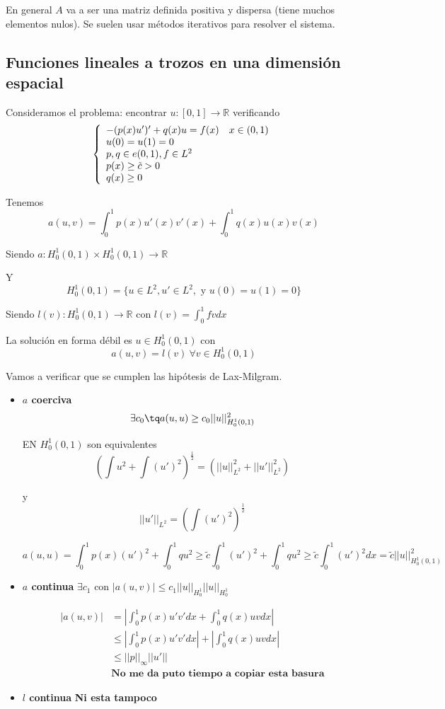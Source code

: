 	En general $A$ va a ser una matriz definida positiva y dispersa (tiene muchos elementos nulos). Se suelen usar métodos iterativos para resolver el sistema.
	
	\subsection{Funciones lineales a trozos en una dimensión espacial}
	Consideramos el problema: encontrar $u:[0,1]\longrightarrow \mathbb{R}$ verificando 
	\begin{equation}
	\left\{
		\begin{array}{l l}
		-(p(x)u')'+q(x)u=f(x) & x\in(0,1)\\
		u(0)=u(1)=0 &\\
		p,q\in e(0,1) , f\in L^2\\
		p(x) \ge \tilde{c} > 0 &\\
		q(x) \ge 0 &
		\end{array}
		\right.
	\end{equation}
	
	Tenemos
	$$a(u,v) = \int_{0}^{1}p(x) u'(x) v'(x) + \int_{0}^{1}q(x)u(x)v(x)$$
	
	Siendo $a:H_0^1(0,1)\times H_0^1(0,1) \longrightarrow \mathbb{R}$
	
	Y
	$$H_0^1(0,1) =\{u\in L^2 , u'\in L^2, \text{ y }u(0)=u(1)=0\}$$
	
	Siendo $l(v): H_0^1(0,1) \longrightarrow\mathbb{R}$ con $l(v) = \int_{0}^{1}fvdx$
	
	La solución en forma débil es $u\in H_0^1(0,1)$ con 
		$$a(u,v) = l(v) \ \forall v \in H_0^1(0,1)$$
		
	Vamos a verificar que se cumplen las hipótesis de Lax-Milgram.
	\begin{itemize}
		\item \textbf{$a$ coerciva}
		$$\exists c_0\tq a(u,u)\ge c_0||u||^2_{H_0^1(0,1)}$$
		
		EN $H_0^1(0,1)$ son equivalentes
		$$(\int u^2 + \int (u')^2)^\frac{1}{2} = (||u||^2_{L^2}+||u'||^2_{L^2})$$
		
		y
		$$||u'||_{L^2} = (\int (u')^2)^\frac{1}{2}$$
		
		$$a(u,u) = \int_0^1 p(x) (u')^2 + \int_0^1 qu^2 \ge \tilde{c} \int_0^1 (u')^2 + \int_{0}^{1}qu^2\ge \tilde{c}\int_0^1 (u')^2 dx = \tilde{c}||u||^2_{H_0^1(0,1)}$$
		
		\item \textbf{$a$ continua}
		$\exists c_1$ con $|a(u,v)| \le c_1||u||_{H_0^1}||u||_{H_0^1}$
		
		\begin{align*}
			|a(u,v)| & = |\int_{0}^{1}p(x)u'v'dx + \int_{0}^{1}q(x)uvdx| \\
			& \le |\int_0^1 p(x) u'v'dx| + |\int_{0}^{1}q(x)uvdx|\\
			& \le ||p||_\infty ||u'||\\
			& \textbf{No me da puto tiempo a copiar esta basura}
		\end{align*}
		
		\item \textbf{$l$ continua}
		\textbf{Ni esta tampoco}
	\end{itemize}
	

